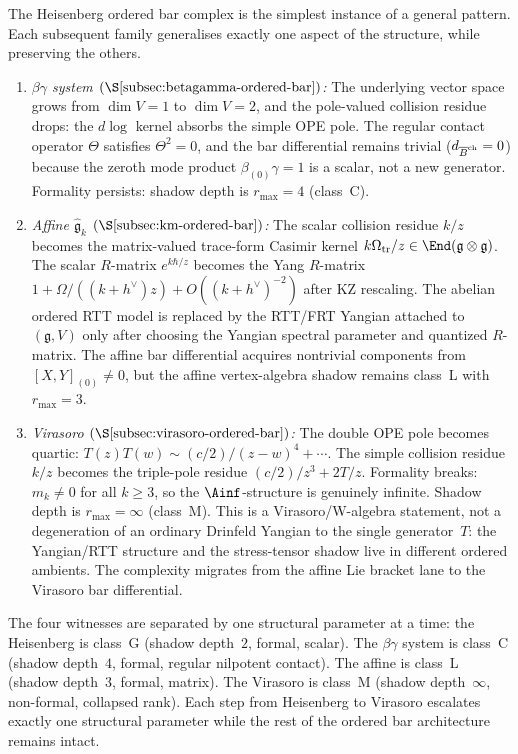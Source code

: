 \begin{remark}
\label{rem:heisenberg-prototype}
The Heisenberg ordered bar complex is the simplest instance of a
general pattern. Each subsequent family generalises exactly one
aspect of the structure, while preserving the others.
\begin{enumerate}[nosep]
\item \emph{$\beta\gamma$ system
 $(\S\ref{subsec:betagamma-ordered-bar})$:}
 The underlying vector space grows from $\dim V = 1$ to $\dim V = 2$,
 and the pole-valued collision residue drops: the $d\log$ kernel absorbs
 the simple OPE pole. The regular contact operator $\Theta$ satisfies
 $\Theta^2=0$, and the bar differential remains trivial
 ($d_{\overline{B}^{\mathrm{ch}}}=0$) because the zeroth mode product
 $\beta_{(0)}\gamma=1$ is a scalar, not a new generator. Formality
 persists: shadow depth is $r_{\max}=4$ (class~C).

\item \emph{Affine $\widehat{\mathfrak{g}}_k$
 $(\S\ref{subsec:km-ordered-bar})$:}
 The scalar collision residue $k/z$ becomes the matrix-valued
 trace-form Casimir kernel
 $k\Omega_{\mathrm{tr}}/z \in \End(\mathfrak{g}\otimes\mathfrak{g})$.
 The scalar $R$-matrix $e^{k\hbar/z}$ becomes the Yang $R$-matrix
 $1+\Omega/((k+h^\vee)z)+O((k+h^\vee)^{-2})$ after KZ rescaling. The
 abelian ordered RTT model is replaced by the RTT/FRT Yangian attached
 to $(\mathfrak g,V)$ only after choosing the Yangian spectral
 parameter and quantized $R$-matrix. The affine bar differential
 acquires nontrivial components from $[X,Y]_{(0)}\ne0$, but the affine
 vertex-algebra shadow remains class~L with $r_{\max}=3$.

\item \emph{Virasoro $(\S\ref{subsec:virasoro-ordered-bar})$:}
 The double OPE pole becomes quartic: $T(z)T(w) \sim (c/2)/(z-w)^4
 + \cdots$. The simple collision residue $k/z$ becomes the
 triple-pole residue $(c/2)/z^3 + 2T/z$. Formality breaks: $m_k \neq 0$ for all $k\ge 3$, so the
 $\Ainf$-structure is genuinely infinite. Shadow depth is
 $r_{\max} = \infty$ (class~M). This is a Virasoro/W-algebra statement,
 not a degeneration of an ordinary Drinfeld Yangian to the single
 generator~$T$: the Yangian/RTT structure and the stress-tensor shadow
 live in different ordered ambients. The complexity migrates from the
 affine Lie bracket lane to the Virasoro bar differential.
\end{enumerate}

\noindent
The four witnesses are separated by one structural parameter at a time:
the Heisenberg is class~G (shadow depth~$2$, formal,
scalar). The $\beta\gamma$ system is class~C (shadow depth~$4$, formal,
regular nilpotent contact). The affine is class~L (shadow depth~$3$, formal, matrix).
The Virasoro is class~M (shadow depth~$\infty$, non-formal, collapsed rank).
Each step from Heisenberg to Virasoro escalates exactly one structural
parameter while the rest of the ordered bar architecture remains
intact.
\end{remark}

